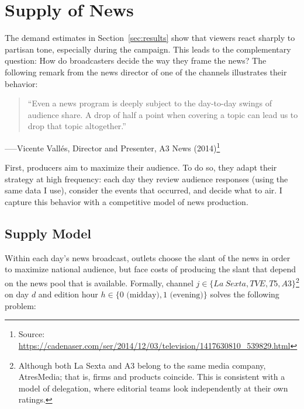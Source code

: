 \documentclass[12pt]{article}
\begin{document}
 



\section{Supply of News}


\label{sec:supply}



The demand estimates in Section~\ref{sec:results} show that viewers react sharply to
partisan tone, especially during the campaign.  This  leads to the complementary question:
How do broadcasters decide the way they frame the news? 
The following remark from the news director of one of the channels illustrates their behavior: 


\begin{quote}
	“Even a news program is deeply subject to the day-to-day swings of audience share.  
	A drop of half a point when covering a topic can lead us to drop that topic altogether.”
\end{quote}
\hspace*{\fill}–––Vicente Vallés, Director and Presenter, A3 News (2014)\footnote{Source: \url{https://cadenaser.com/ser/2014/12/03/television/1417630810_539829.html}}



First, producers aim to maximize their audience. To do so, they adapt their strategy at high frequency: each day they review audience responses (using the same data I use), consider the events that occurred, and decide what to air. I capture this behavior with a competitive model of news production.




\subsection{Supply Model}

Within each day's news broadcast, outlets choose the slant of the news in order to maximize national audience, but face costs of producing the slant that depend on the news pool that is available.  Formally, channel $j\in \{La \ Sexta, TVE, T5, A3\}$\footnote{Although both La Sexta and A3 belong to the same media company, AtresMedia; that is, firms and products coincide. This is consistent with a model of delegation, where editorial teams look independently at their own ratings. } on day $d$ and edition hour $h\in\{0\text{ (midday)},1\text{ (evening)}\}$ solves the following problem:
\end{document}
